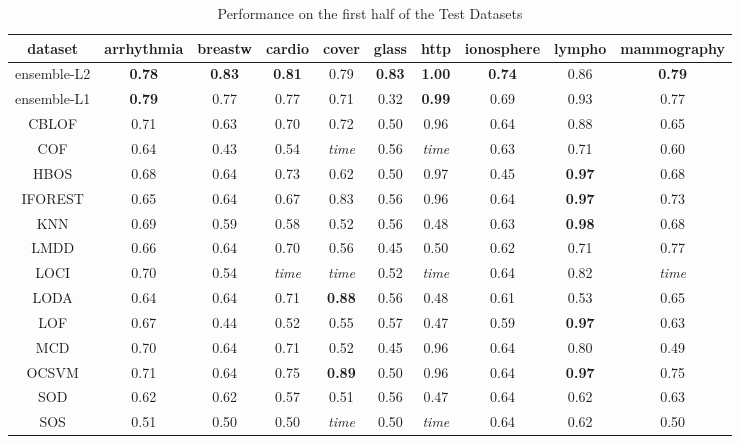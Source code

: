 \begin{table*}[!t]
\renewcommand{\arraystretch}{1.25}
\caption{Performance on the first half of the Test Datasets}
\label{table:results:test-performance-1}
\centering
\begin{tabular}{|c|c|c|c|c|c|c|c|c|c|}
\hline
\textbf{dataset} & \textbf{arrhythmia} & \textbf{breastw} & \textbf{cardio} & \textbf{cover} & \textbf{glass} & \textbf{http} & \textbf{ionosphere} & \textbf{lympho} & \textbf{mammography} \\
\hline
ensemble-L2 & \bfseries 0.78 & \bfseries 0.83 & \bfseries 0.81 & 0.79 & \bfseries 0.83 & \bfseries 1.00 & \bfseries 0.74 & 0.86 & \bfseries 0.79 \\
\hline
ensemble-L1 & \bfseries 0.79 & 0.77 & 0.77 & 0.71 & 0.32 & \bfseries 0.99 & 0.69 & 0.93 & 0.77 \\
\hline
CBLOF & 0.71 & 0.63 & 0.70 & 0.72 & 0.50 & 0.96 & 0.64 & 0.88 & 0.65 \\
\hline
COF & 0.64 & 0.43 & 0.54 & \textit{time} & 0.56 & \textit{time} & 0.63 & 0.71 & 0.60 \\
\hline
HBOS & 0.68 & 0.64 & 0.73 & 0.62 & 0.50 & 0.97 & 0.45 & \bfseries 0.97 & 0.68 \\
\hline
IFOREST & 0.65 & 0.64 & 0.67 & 0.83 & 0.56 & 0.96 & 0.64 & \bfseries 0.97 & 0.73 \\
\hline
KNN & 0.69 & 0.59 & 0.58 & 0.52 & 0.56 & 0.48 & 0.63 & \bfseries 0.98 & 0.68 \\
\hline
LMDD & 0.66 & 0.64 & 0.70 & 0.56 & 0.45 & 0.50 & 0.62 & 0.71 & 0.77 \\
\hline
LOCI & 0.70 & 0.54 & \textit{time} & \textit{time} & 0.52 & \textit{time} & 0.64 & 0.82 & \textit{time} \\
\hline
LODA & 0.64 & 0.64 & 0.71 & \bfseries 0.88 & 0.56 & 0.48 & 0.61 & 0.53 & 0.65 \\
\hline
LOF & 0.67 & 0.44 & 0.52 & 0.55 & 0.57 & 0.47 & 0.59 & \bfseries 0.97 & 0.63 \\
\hline
MCD & 0.70 & 0.64 & 0.71 & 0.52 & 0.45 & 0.96 & 0.64 & 0.80 & 0.49 \\
\hline
OCSVM & 0.71 & 0.64 & 0.75 & \bfseries 0.89 & 0.50 & 0.96 & 0.64 & \bfseries 0.97 & 0.75 \\
\hline
SOD & 0.62 & 0.62 & 0.57 & 0.51 & 0.56 & 0.47 & 0.64 & 0.62 & 0.63 \\
\hline
SOS & 0.51 & 0.50 & 0.50 & \textit{time} & 0.50 & \textit{time} & 0.64 & 0.62 & 0.50 \\
\hline
\end{tabular}
\end{table*}

